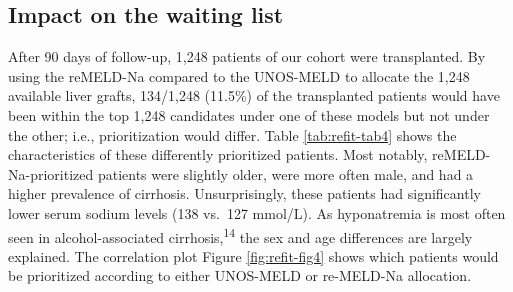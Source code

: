 \documentclass[11pt,english,]{book} %
\begin{document}
\begin{table}

\caption{\label{tab:refit-tab3}Comparison of models in validation data}
\centering
{}
\end{table}

\hypertarget{impact-on-the-waiting-list-1}{%
\subsection*{Impact on the waiting list}\label{impact-on-the-waiting-list-1}}

After 90 days of follow-up, 1,248 patients of our cohort were transplanted. By using the reMELD-Na compared to the UNOS-MELD to allocate the 1,248 available liver grafts, 134/1,248 (11.5\%) of the transplanted patients would have been within the top 1,248 candidates under one of these models but not under the other; i.e., prioritization would differ. Table \ref{tab:refit-tab4} shows the characteristics of these differently prioritized patients. Most notably, reMELD-Na-prioritized patients were slightly older, were more often male, and had a higher prevalence of cirrhosis. Unsurprisingly, these patients had significantly lower serum sodium levels (138 vs.~127 mmol/L). As hyponatremia is most often seen in alcohol-associated cirrhosis,\textsuperscript{14} the sex and age differences are largely explained.
The correlation plot Figure \ref{fig:refit-fig4} shows which patients would be prioritized according to either UNOS-MELD or re-MELD-Na allocation.
\end{document}
